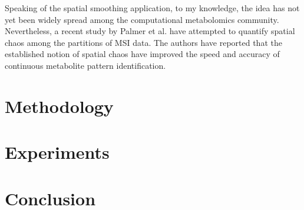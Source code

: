 \documentclass{mpaper}
\begin{document}
\par Speaking of the spatial smoothing application, to my knowledge, the idea has not yet been widely spread among the computational metabolomics community. Nevertheless, a recent study by Palmer et al. \cite{palmer2016fdr} have attempted to quantify spatial chaos among the partitions of MSI data. The authors have reported that the established notion of spatial chaos have improved the speed and accuracy of continuous metabolite pattern identification. 




\section{Methodology}

\lipsum[1-3]

 \section{Experiments}

\lipsum[1-3]

\section{Conclusion}

\lipsum[1]



\end{document}
